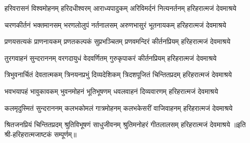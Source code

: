 
\fourlineindentedshloka
{हरिवरासनं विश्वमोहनम्}
{हरिदधीश्वरम् आराध्यपादुकम्}
{अरिविमर्दनं नित्यनर्तनम्}
{हरिहरात्मजं देवमाश्रये}

\fourlineindentedshloka
{चरणकीर्तनं भक्तमानसम्}
{भरणलोलुपं नर्तनालसम्}
{अरुणभासुरं भूतनायकम्}
{हरिहरात्मजं देवमाश्रये}

\fourlineindentedshloka
{प्रणयसत्यकं प्राणनायकम्}
{प्रणतकल्पकं सुप्रभञ्चितम्}
{प्रणवमन्दिरं कीर्तनप्रियम्}
{हरिहरात्मजं देवमाश्रये}

\fourlineindentedshloka
{तुरगवाहनं सुन्दराननम्}
{वरगदायुधं वेदवर्णितम्}
{गुरुकृपाकरं कीर्तनप्रियम्}
{हरिहरात्मजं देवमाश्रये}

\fourlineindentedshloka
{त्रिभुवनार्चितं देवतात्मकम्}
{त्रिनयनप्रभुं दिव्यदेशिकम्}
{त्रिदशपूजितं चिन्तितप्रदम्}
{हरिहरात्मजं देवमाश्रये}

\fourlineindentedshloka
{भवभयापहं भावुकावकम्}
{भुवनमोहनं भूतिभूषणम्}
{धवलवाहनं दिव्यवारणम्}
{हरिहरात्मजं देवमाश्रये}

\fourlineindentedshloka
{कलमृदुस्मितं सुन्दराननम्}
{कलभकोमलं गात्रमोहनम्}
{कलभकेसरीं वाजिवाहनम्}
{हरिहरात्मजं देवमाश्रये}

\fourlineindentedshloka
{श्रितजनप्रियं चिन्तितप्रदम्}
{श्रुतिविभूषणं साधुजीवनम्}
{श्रुतिमनोहरं गीतलालसम्}
{हरिहरात्मजं देवमाश्रये}
॥इति श्री-हरिहरात्मजाष्टकं सम्पूर्णम्॥